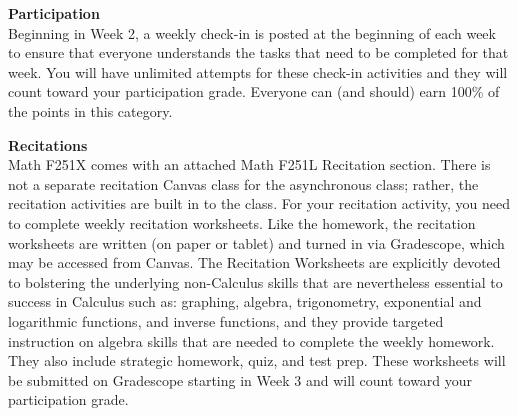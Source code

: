 \documentclass[12pt]{article}
\renewcommand{\emph}[1]{\textsf{\textbf{#1}}}
\newcommand{\localhead}[1]{\par\smallskip\textbf{#1}\nobreak\\}%
\def\heading#1{\localhead{\large\emph{#1}}}
\newenvironment{clist}%
{\bgroup\parskip 0pt\begin{list}{$\bullet$}{\partopsep 4pt\topsep 0pt\itemsep -2pt}}%
{\end{list}\egroup}%
\begin{document}
%

\heading{Participation}
Beginning in Week 2, a weekly check-in is posted at the beginning of each week to ensure that everyone understands the tasks that need to be completed for that week. You will have unlimited attempts for these check-in activities and they will count toward your participation grade. Everyone can (and should) earn 100\% of the points in this category.

\heading{Recitations}
Math F251X comes with an attached Math F251L Recitation section. There is not a separate recitation Canvas class for the asynchronous class; rather, the recitation activities are built in to the class. For your recitation activity, you need to complete weekly recitation worksheets. Like the homework, the recitation worksheets are written (on paper or tablet) and turned in via Gradescope, which may be accessed from Canvas. The Recitation Worksheets are explicitly devoted to bolstering the underlying non-Calculus skills that are nevertheless essential to success in Calculus such as: graphing, algebra, trigonometry, exponential and logarithmic functions, and inverse functions, and they provide targeted instruction on algebra skills that are needed to complete the weekly homework. They also include strategic homework, quiz, and test prep. These worksheets will be submitted on Gradescope starting in Week 3 and will count toward your participation grade.
\end{document}
